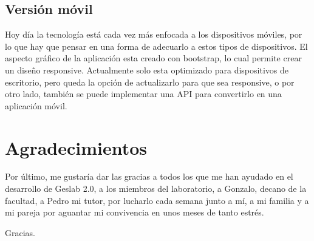 \subsection{Versión móvil}
Hoy día la tecnología está cada vez más enfocada a los dispositivos móviles, por lo que hay que pensar en una forma de adecuarlo a estos tipos de dispositivos. El aspecto gráfico de la aplicación esta creado con bootstrap, lo cual permite crear un diseño responsive. Actualmente solo esta optimizado para dispositivos de escritorio, pero queda la opción de actualizarlo para que sea responsive, o por otro lado, también se puede implementar una API para convertirlo en una aplicación móvil. 


\section{Agradecimientos}

Por último, me gustaría dar las gracias a todos los que me han ayudado en el desarrollo de Geslab 2.0, a los miembros del laboratorio, a Gonzalo, decano de la facultad, a Pedro mi tutor, por lucharlo cada semana junto a mí, a mi familia y a mi pareja por aguantar mi convivencia en unos meses de tanto estrés. 

Gracias.